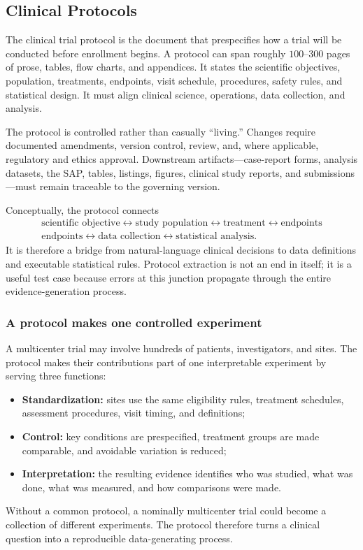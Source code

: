 \documentclass[12pt,oneside]{book}
\numberwithin{equation}{section}
\theoremstyle{definition}
\theoremstyle{plain}
\theoremstyle{remark}
\begin{document}
\subsection{Clinical Protocols}
The clinical trial protocol is the document that prespecifies how a trial will
be conducted before enrollment begins.  A protocol can span roughly
$100$--$300$ pages of prose, tables, flow charts, and appendices.  It states the
scientific objectives, population, treatments, endpoints, visit schedule,
procedures, safety rules, and statistical design.  It must align clinical
science, operations, data collection, and analysis.

The protocol is controlled rather than casually ``living.''  Changes require
documented amendments, version control, review, and, where applicable,
regulatory and ethics approval.  Downstream artifacts---case-report forms,
analysis datasets, the SAP, tables, listings, figures, clinical study reports,
and submissions---must remain traceable to the governing version.

Conceptually, the protocol connects
\[
\begin{gathered}
 \text{scientific objective}\leftrightarrow\text{study population}
 \leftrightarrow\text{treatment}\leftrightarrow\text{endpoints}\\
 \text{endpoints}\leftrightarrow\text{data collection}
 \leftrightarrow\text{statistical analysis}.
\end{gathered}
\]
It is therefore a bridge from natural-language clinical decisions to data
definitions and executable statistical rules.  Protocol extraction is not an
end in itself; it is a useful test case because errors at this junction
propagate through the entire evidence-generation process.

\subsubsection{A protocol makes one controlled experiment}

A multicenter trial may involve hundreds of patients, investigators, and
sites.  The protocol makes their contributions part of one interpretable
experiment by serving three functions:
\begin{itemize}
    \item \textbf{Standardization:} sites use the same eligibility rules,
    treatment schedules, assessment procedures, visit timing, and definitions;
    \item \textbf{Control:} key conditions are prespecified, treatment groups
    are made comparable, and avoidable variation is reduced;
    \item \textbf{Interpretation:} the resulting evidence identifies who was
    studied, what was done, what was measured, and how comparisons were made.
\end{itemize}
Without a common protocol, a nominally multicenter trial could become a
collection of different experiments.  The protocol therefore turns a clinical
question into a reproducible data-generating process.
\end{document}
